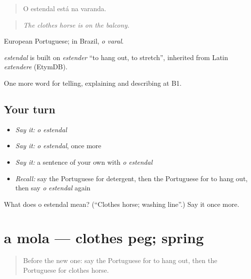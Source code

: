 \begin{quote}
O estendal está na varanda.
\end{quote}

\begin{quote}
\emph{The clothes horse is on the balcony.}
\end{quote}

European Portuguese; in Brazil, \emph{o varal}.

\begin{cousinweb}
\emph{estendal} is built on \emph{estender} \textquotedblleft{}to hang out, to stretch\textquotedblright{}, inherited from Latin \emph{extendere} (EtymDB).
\end{cousinweb}

\begin{grammarlens}[title={What you've built}]
One more word for telling, explaining and describing at B1.
\end{grammarlens}

\subsection*{Your turn}
\begin{itemize}
\raggedright
  \item \emph{Say it:} \emph{o estendal}
  \item \emph{Say it:} \emph{o estendal}, once more
  \item \emph{Say it:} a sentence of your own with \emph{o estendal}
  \item \emph{Recall:} say the Portuguese for detergent, then the Portuguese for to hang out, then say \emph{o estendal} again
\end{itemize}

\begin{tcolorbox}[breakable,colback=teal!4,colframe=teal!35!black,title={Before you move on}]
What does o estendal mean? (\textquotedblleft{}Clothes horse; washing line\textquotedblright{}.) Say it once more.
\end{tcolorbox}
\section[a mola]{a mola — clothes peg; spring}

\label{lesson:PT-C529-mola}



\begin{quote}
Before the new one: say the Portuguese for to hang out, then the Portuguese for clothes horse.
\end{quote}

